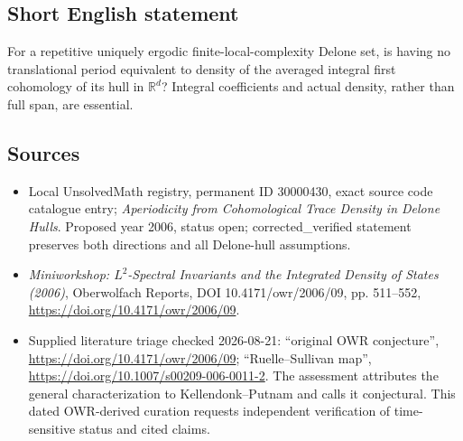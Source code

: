 \documentclass[11pt]{article}
\newcommand{\R}{\mathbb{R}}
\begin{document}
\subsection{Short English statement}
For a repetitive uniquely ergodic finite-local-complexity Delone set, is having no translational period equivalent to density of the averaged integral first cohomology of its hull in $\R^d$? Integral coefficients and actual density, rather than full span, are essential.
\subsection{Sources}
\begin{itemize}
\item Local UnsolvedMath registry, permanent ID 30000430, exact source code catalogue entry; \emph{Aperiodicity from Cohomological Trace Density in Delone Hulls}. Proposed year 2006, status open; corrected\_verified statement preserves both directions and all Delone-hull assumptions.
\item \emph{Miniworkshop: $L^2$-Spectral Invariants and the Integrated Density of States (2006)}, Oberwolfach Reports, DOI 10.4171/owr/2006/09, pp. 511--552, \url{https://doi.org/10.4171/owr/2006/09}.
\item Supplied literature triage checked 2026-08-21: ``original OWR conjecture'', \url{https://doi.org/10.4171/owr/2006/09}; ``Ruelle--Sullivan map'', \url{https://doi.org/10.1007/s00209-006-0011-2}. The assessment attributes the general characterization to Kellendonk--Putnam and calls it conjectural. This dated OWR-derived curation requests independent verification of time-sensitive status and cited claims.
\end{itemize}
\end{document}
